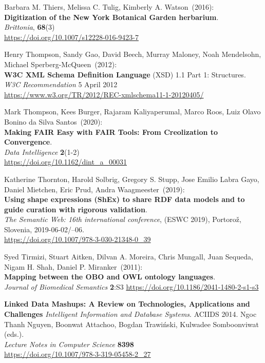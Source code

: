 \begin{thebibliography}{9}
Barbara M. Thiers, Melissa C. Tulig, Kimberly A. Watson~(2016): \\
\textbf{Digitization of the New York Botanical Garden herbarium}.\\
\emph{Brittonia}, \textbf{68}(3)\\
\url{https://doi.org/10.1007/s12228-016-9423-7}


Henry Thompson, Sandy Gao, David Beech, Murray Maloney, Noah Mendelsohn, Michael Sperberg-McQueen~(2012): \\
\textbf{W3C XML Schema Definition Language} ({XSD}) 1.1 {Part} 1: {Structures}. \\
\emph{W3C Recommendation} 5 April 2012 \\
\url{https://www.w3.org/TR/2012/REC-xmlschema11-1-20120405/}

Mark Thompson, Kees Burger, Rajaram Kaliyaperumal, Marco Roos, Luiz Olavo Bonino da Silva Santos~(2020): \\
\textbf{Making FAIR Easy with FAIR Tools: From Creolization to Convergence}.\\
\emph{Data Intelligence} \textbf{2}(1-2)\\
\url{https://doi.org/10.1162/dint_a_00031}

Katherine Thornton, Harold Solbrig, Gregory S. Stupp, Jose Emilio Labra
Gayo, Daniel Mietchen, Eric Prud, Andra Waagmeester~(2019): \\
\textbf{Using shape expressions ({ShEx}) to share {RDF} data models and
to guide curation with rigorous validation}. \\
\emph{The Semantic Web: 16th international conference}, (ESWC 2019), Portorož, Slovenia,
2019-06-02/--06.\\
\url{https://doi.org/10.1007/978-3-030-21348-0_39}


Syed Tirmizi, Stuart Aitken, Dilvan A. Moreira, Chris Mungall, Juan
Sequeda, Nigam H. Shah, Daniel P. Miranker~(2011): \\
\textbf{Mapping between the {OBO} and {OWL} ontology languages}. \\
\emph{Journal of Biomedical Semantics} \textbf{2}:S3
\url{https://doi.org/10.1186/2041-1480-2-s1-s3}

\textbf{Linked Data Mashups: A Review on Technologies, Applications and Challenges}
\emph{Intelligent Information and Database Systems}. ACIIDS 2014. Ngoc Thanh Nguyen, Boonwat Attachoo, Bogdan Trawiński, Kulwadee Somboonviwat (eds.).\\
\emph{Lecture Notes in Computer Science} \textbf{8398}\\
\url{https://doi.org/10.1007/978-3-319-05458-2_27}


\end{thebibliography}
